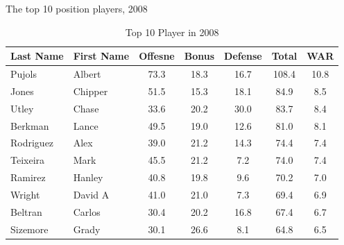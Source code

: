 \documentclass[12pt]{article}
\begin{document}
\begin{table}[htp]
  \caption{Full Nitty-Gritty}
  \label{tab:def_metrics} 
  \centering
\cite*{web:Wyers:Part3}
\end{table}

The top 10 position players, 2008

\begin{table}[htbp]
  \caption{Top 10 Player in 2008}
  \label{tab:top} 
  \centering
  \begin{tabular}{|l|l|c|c|c|c|c|}
     \hline
     \textbf{Last Name} & \textbf{First Name} & \textbf{Offesne} & \textbf{Bonus} & \textbf{Defense} & \textbf{Total} & \textbf{WAR}\\
     \hline
     Pujols & Albert & 73.3 & 18.3 & 16.7 & 108.4 & 10.8\\
     Jones & Chipper & 51.5 & 15.3 & 18.1 & 84.9 & 8.5\\
     Utley & Chase & 33.6 & 20.2 & 30.0 & 83.7 & 8.4\\
     Berkman & Lance & 49.5 & 19.0 & 12.6 & 81.0 & 8.1\\
     Rodriguez & Alex & 39.0 & 21.2 & 14.3 & 74.4 & 7.4\\
     Teixeira & Mark & 45.5 & 21.2 & 7.2 & 74.0 & 7.4\\
     Ramirez & Hanley & 40.8 & 19.8 & 9.6 & 70.2 & 7.0\\
     Wright & David A & 41.0 & 21.0 & 7.3 & 69.4 & 6.9\\
     Beltran & Carlos & 30.4 & 20.2 & 16.8 & 67.4 & 6.7\\
     Sizemore & Grady & 30.1 & 26.6 & 8.1 & 64.8 & 6.5\\
    \hline
  \end{tabular}
\end{table}
\end{document}
